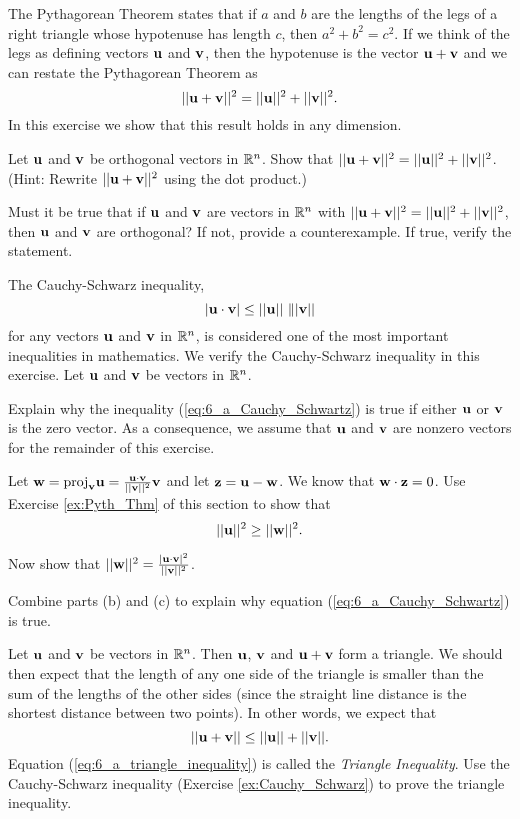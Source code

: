 \item \label{ex:Pyth_Thm} The Pythagorean Theorem states that if $a$ and $b$ are the lengths of the legs of a right triangle whose hypotenuse has length $c$, then $a^2+b^2=c^2$. If we think of the legs as defining vectors $\mathbf{u}$ and $\mathbf{v}$, then the hypotenuse is the vector $\mathbf{u}+\mathbf{v}$ and we can restate the Pythagorean Theorem as 
\[||\mathbf{u}+\mathbf{v}||^2 = ||\mathbf{u}||^2+||\mathbf{v}||^2.\]
In this exercise we show that this result holds in any dimension.
	\ba
	\item Let $\mathbf{u}$ and $\mathbf{v}$ be orthogonal vectors in $\mathbb{R}^n$. Show that $||\mathbf{u}+\mathbf{v}||^2 = ||\mathbf{u}||^2+||\mathbf{v}||^2$. (Hint: Rewrite $||\mathbf{u}+\mathbf{v}||^2$ using the dot product.)  
	\item Must it be true that if $\mathbf{u}$ and $\mathbf{v}$ are vectors in $\mathbb{R}^n$ with $||\mathbf{u}+\mathbf{v}||^2 = ||\mathbf{u}||^2+||\mathbf{v}||^2$, then $\mathbf{u}$ and $\mathbf{v}$ are orthogonal? If not, provide a counterexample. If true, verify the statement.
	\ea
	
\item \label{ex:Cauchy_Schwarz} The Cauchy-Schwarz inequality,
\begin{equation} \label{eq:6_a_Cauchy_Schwartz}
|\mathbf{u} \cdot \mathbf{v}| \leq ||\mathbf{u}|| \ \||\mathbf{v}||
\end{equation}
for any vectors $\mathbf{u}$ and $\mathbf{v}$ in $\mathbb{R}^n$, is considered one of the most important inequalities in mathematics. We verify the Cauchy-Schwarz inequality in this exercise. Let $\mathbf{u}$ and $\mathbf{v}$ be vectors in $\mathbb{R}^n$.
	\ba
	\item Explain why the inequality (\ref{eq:6_a_Cauchy_Schwartz}) is true if either $\mathbf{u}$ or $\mathbf{v}$ is the zero vector. As a consequence, we assume that $\mathbf{u}$ and $\mathbf{v}$ are nonzero vectors for the remainder of this exercise. 
	\item Let $\mathbf{w} = \text{proj}_{\mathbf{v}} \mathbf{u} = \frac{\mathbf{u} \cdot \mathbf{v}}{||\mathbf{v}||^2} \mathbf{v}$ and let $\mathbf{z} = \mathbf{u} - \mathbf{w}$. We know that $\mathbf{w} \cdot \mathbf{z} = 0$. Use Exercise \ref{ex:Pyth_Thm} of this section to show that 
	\[||\mathbf{u}||^2 \geq ||\mathbf{w}||^2.\]


	\item Now show that $||\mathbf{w}||^2 = \frac{|\mathbf{u} \cdot \mathbf{v}|^2}{||\mathbf{v}||^2}$. 

	\item Combine parts (b) and (c) to explain why equation (\ref{eq:6_a_Cauchy_Schwartz}) is true. 
	

	\ea
	
\item Let $\mathbf{u}$ and $\mathbf{v}$ be vectors in $\mathbb{R}^n$. Then $\mathbf{u}$, $\mathbf{v}$ and $\mathbf{u}+\mathbf{v}$ form a triangle. We should then expect that the length of any one side of the triangle is smaller than the sum of the lengths of the other sides (since the straight line distance is the shortest distance between two points). In other words, we expect that 
\begin{equation} \label{eq:6_a_triangle_inequality}
||\mathbf{u} + \mathbf{v}|| \leq ||\mathbf{u}|| + ||\mathbf{v}||.
\end{equation}
Equation (\ref{eq:6_a_triangle_inequality}) is called the \emph{Triangle Inequality}. Use the Cauchy-Schwarz inequality (Exercise \ref{ex:Cauchy_Schwarz}) to prove the triangle inequality.

